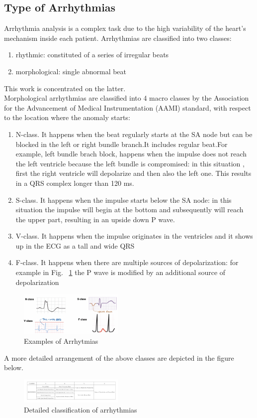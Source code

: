 \documentclass[LaM,binding=0.6cm]{sapthesis}
\begin{document}
\subsection{Type of Arrhythmias}
Arrhythmia analysis is a complex task due to the high variability of the heart's mechanism inside each patient. Arrhythmias are classified into two classes:
\begin{enumerate}
\item rhythmic: constituted of a series of irregular beats
\item morphological: single abnormal beat
\end{enumerate}
This work is concentrated on the latter.\\Morphological arrhythmias are classified into 4 macro classes by the Association for the Advancement of Medical Instrumentation (AAMI) standard, with respect to the location where the anomaly starts:
\begin{enumerate}
\item N-class. It happens when the beat regularly starts at the SA node but can be blocked in the left or right bundle branch.It includes regular beat.For example, left bundle brach block, happens when the impulse does not reach the left ventricle because the left bundle is compromised: in this situation , first the right ventricle will depolarize and then also the left one. This results in a QRS complex longer than 120 ms.
\item S-class. It happens when the impulse starts below the SA node: in this situation the impulse will begin at the bottom and subsequently will reach the upper part, resulting in an upside down P wave.
\item V-class. It happens when the impulse originates in the ventricles and it shows up in the ECG as a tall and wide QRS
\item F-class. It happens when there are multiple sources of depolarization: for example in Fig. ~\ref{fig:arrhex} the P wave is modified by an additional source of depolarization
\end{enumerate}
\begin{figure}[H]
	\includegraphics[width=50mm,scale=0.7]{arrhex}
	\caption{Examples of Arrhytmias}
	\label{fig:arrhex}
\end{figure}
A more detailed arrangement of the above classes are depicted in the figure below.
\begin{figure}[H]
	\includegraphics[width=50mm,scale=0.7]{allclass}
	\caption{Detailed classification of arrhythmias }
	\label{fig:allclass}
\end{figure}
\end{document}
